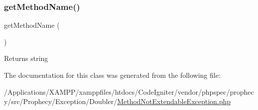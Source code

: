 \subsubsection{\texorpdfstring{get\+Method\+Name()}{getMethodName()}}
{\footnotesize\ttfamily get\+Method\+Name (\begin{DoxyParamCaption}{ }\end{DoxyParamCaption})}

\begin{DoxyReturn}{Returns}
string 
\end{DoxyReturn}


The documentation for this class was generated from the following file\+:\begin{DoxyCompactItemize}
\item 
/\+Applications/\+X\+A\+M\+P\+P/xamppfiles/htdocs/\+Code\+Igniter/vendor/phpspec/prophecy/src/\+Prophecy/\+Exception/\+Doubler/\mbox{\hyperlink{_method_not_extendable_exception_8php}{Method\+Not\+Extendable\+Exception.\+php}}\end{DoxyCompactItemize}
